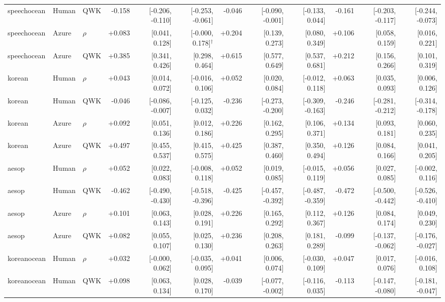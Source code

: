 \documentclass[10pt]{article}
\begin{document}
\begin{landscape}
\begin{longtable}{@{}lllrrrrrrrrr@{}}
speechocean & Human & QWK & -0.158 & [-0.206, -0.110] & [-0.253, -0.061] & -0.046 & [-0.090, -0.001] & [-0.133, 0.044] & -0.161 & [-0.203, -0.117] & [-0.244, -0.073]\\
speechocean & Azure & $\rho$ & +0.083 & [0.041, 0.128] & [-0.000, 0.178]$^{\dagger}$ & +0.204 & [0.139, 0.273] & [0.080, 0.349] & +0.106 & [0.058, 0.159] & [0.016, 0.221]\\
speechocean & Azure & QWK & +0.385 & [0.341, 0.426] & [0.298, 0.464] & +0.615 & [0.577, 0.649] & [0.537, 0.681] & +0.212 & [0.156, 0.266] & [0.101, 0.319]\\
\addlinespace[2pt]
korean & Human & $\rho$ & +0.043 & [0.014, 0.072] & [-0.016, 0.106] & +0.052 & [0.020, 0.084] & [-0.012, 0.118] & +0.063 & [0.035, 0.093] & [0.006, 0.126]\\
korean & Human & QWK & -0.046 & [-0.086, -0.007] & [-0.125, 0.032] & -0.236 & [-0.273, -0.200] & [-0.309, -0.163] & -0.246 & [-0.281, -0.212] & [-0.314, -0.178]\\
korean & Azure & $\rho$ & +0.092 & [0.051, 0.136] & [0.012, 0.186] & +0.226 & [0.162, 0.295] & [0.106, 0.371] & +0.134 & [0.093, 0.181] & [0.060, 0.235]\\
korean & Azure & QWK & +0.497 & [0.455, 0.537] & [0.415, 0.575] & +0.425 & [0.387, 0.460] & [0.350, 0.494] & +0.126 & [0.084, 0.166] & [0.041, 0.205]\\
\addlinespace[2pt]
aesop & Human & $\rho$ & +0.052 & [0.022, 0.083] & [-0.008, 0.118] & +0.052 & [0.019, 0.085] & [-0.015, 0.119] & +0.056 & [0.027, 0.085] & [-0.002, 0.116]\\
aesop & Human & QWK & -0.462 & [-0.490, -0.430] & [-0.518, -0.396] & -0.425 & [-0.457, -0.392] & [-0.487, -0.359] & -0.472 & [-0.500, -0.442] & [-0.526, -0.410]\\
aesop & Azure & $\rho$ & +0.101 & [0.063, 0.143] & [0.028, 0.191] & +0.226 & [0.165, 0.292] & [0.112, 0.367] & +0.126 & [0.084, 0.174] & [0.049, 0.230]\\
aesop & Azure & QWK & +0.082 & [0.055, 0.107] & [0.025, 0.130] & +0.236 & [0.208, 0.263] & [0.181, 0.289] & -0.099 & [-0.137, -0.062] & [-0.176, -0.027]\\
\addlinespace[2pt]
koreanocean & Human & $\rho$ & +0.032 & [-0.000, 0.062] & [-0.035, 0.095] & +0.041 & [0.006, 0.074] & [-0.030, 0.109] & +0.047 & [0.017, 0.076] & [-0.016, 0.108]\\
koreanocean & Human & QWK & +0.098 & [0.063, 0.134] & [0.028, 0.170] & -0.039 & [-0.077, -0.002] & [-0.116, 0.035] & -0.113 & [-0.147, -0.080] & [-0.181, -0.047]\\

\end{longtable}
\end{landscape}
\end{document}
